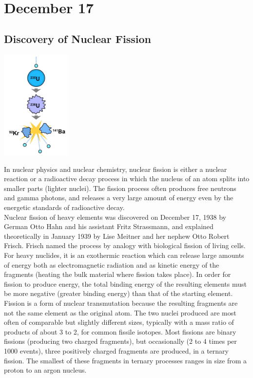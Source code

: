 \documentclass[11pt]{report}
\begin{document}
\section{December 17}
\subsection{Discovery of Nuclear Fission}
\vspace{2mm}\begin{center}\includegraphics[width=3.5cm]{./img/nuclearFission.jpg}\end{center}
In nuclear physics and nuclear chemistry, nuclear fission is either a nuclear reaction or a radioactive decay process in which the nucleus of an atom splits into smaller parts (lighter nuclei). The fission process often produces free neutrons and gamma photons, and releases a very large amount of energy even by the energetic standards of radioactive decay.\\
\indent Nuclear fission of heavy elements was discovered on December 17, 1938 by German Otto Hahn and his assistant Fritz Strassmann, and explained theoretically in January 1939 by Lise Meitner and her nephew Otto Robert Frisch. Frisch named the process by analogy with biological fission of living cells. For heavy nuclides, it is an exothermic reaction which can release large amounts of energy both as electromagnetic radiation and as kinetic energy of the fragments (heating the bulk material where fission takes place). In order for fission to produce energy, the total binding energy of the resulting elements must be more negative (greater binding energy) than that of the starting element.\\ \indent Fission is a form of nuclear transmutation because the resulting fragments are not the same element as the original atom. The two nuclei produced are most often of comparable but slightly different sizes, typically with a mass ratio of products of about 3 to 2, for common fissile isotopes. Most fissions are binary fissions (producing two charged fragments), but occasionally (2 to 4 times per 1000 events), three positively charged fragments are produced, in a ternary fission. The smallest of these fragments in ternary processes ranges in size from a proton to an argon nucleus.
\end{document}
